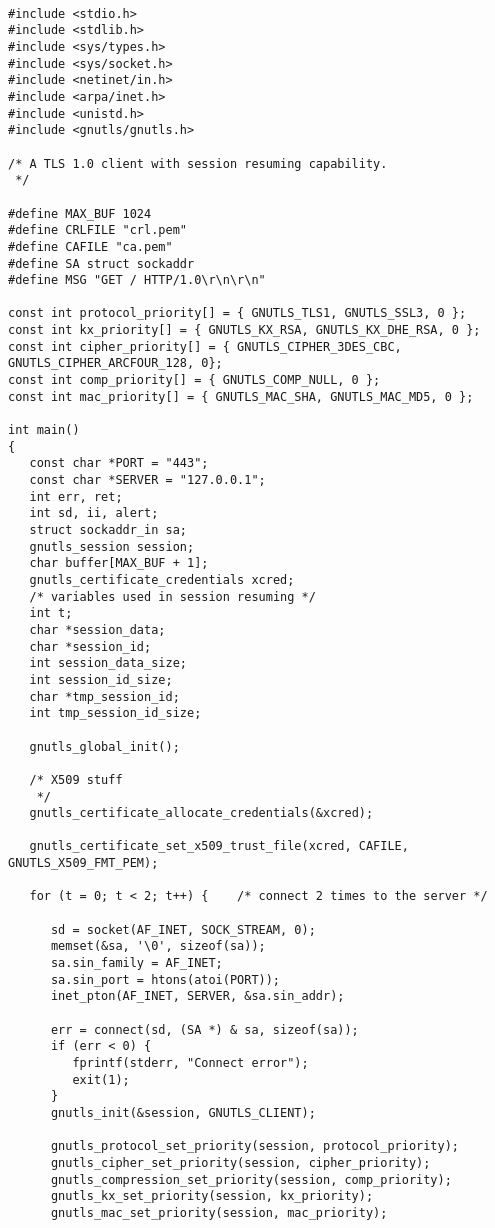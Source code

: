 \begin{verbatim}

#include <stdio.h>
#include <stdlib.h>
#include <sys/types.h>
#include <sys/socket.h>
#include <netinet/in.h>
#include <arpa/inet.h>
#include <unistd.h>
#include <gnutls/gnutls.h>

/* A TLS 1.0 client with session resuming capability.
 */

#define MAX_BUF 1024
#define CRLFILE "crl.pem"
#define CAFILE "ca.pem"
#define SA struct sockaddr
#define MSG "GET / HTTP/1.0\r\n\r\n"

const int protocol_priority[] = { GNUTLS_TLS1, GNUTLS_SSL3, 0 };
const int kx_priority[] = { GNUTLS_KX_RSA, GNUTLS_KX_DHE_RSA, 0 };
const int cipher_priority[] = { GNUTLS_CIPHER_3DES_CBC, GNUTLS_CIPHER_ARCFOUR_128, 0};
const int comp_priority[] = { GNUTLS_COMP_NULL, 0 };
const int mac_priority[] = { GNUTLS_MAC_SHA, GNUTLS_MAC_MD5, 0 };

int main()
{
   const char *PORT = "443";
   const char *SERVER = "127.0.0.1";
   int err, ret;
   int sd, ii, alert;
   struct sockaddr_in sa;
   gnutls_session session;
   char buffer[MAX_BUF + 1];
   gnutls_certificate_credentials xcred;
   /* variables used in session resuming */
   int t;
   char *session_data;
   char *session_id;
   int session_data_size;
   int session_id_size;
   char *tmp_session_id;
   int tmp_session_id_size;

   gnutls_global_init();

   /* X509 stuff 
    */
   gnutls_certificate_allocate_credentials(&xcred);

   gnutls_certificate_set_x509_trust_file(xcred, CAFILE, GNUTLS_X509_FMT_PEM);

   for (t = 0; t < 2; t++) {    /* connect 2 times to the server */

      sd = socket(AF_INET, SOCK_STREAM, 0);
      memset(&sa, '\0', sizeof(sa));
      sa.sin_family = AF_INET;
      sa.sin_port = htons(atoi(PORT));
      inet_pton(AF_INET, SERVER, &sa.sin_addr);

      err = connect(sd, (SA *) & sa, sizeof(sa));
      if (err < 0) {
         fprintf(stderr, "Connect error");
         exit(1);
      }
      gnutls_init(&session, GNUTLS_CLIENT);

      gnutls_protocol_set_priority(session, protocol_priority);
      gnutls_cipher_set_priority(session, cipher_priority);
      gnutls_compression_set_priority(session, comp_priority);
      gnutls_kx_set_priority(session, kx_priority);
      gnutls_mac_set_priority(session, mac_priority);


\end{verbatim}
